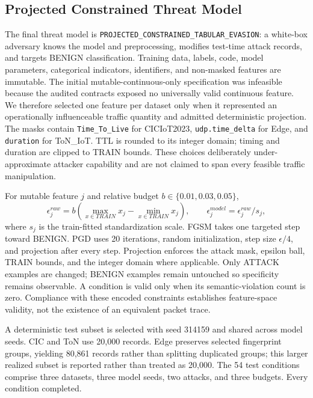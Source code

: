 \documentclass[runningheads]{llncs}
\begin{document}
\subsection{Projected Constrained Threat Model}
The final threat model is \texttt{PROJECTED\_CONSTRAINED\_TABULAR\_EVASION}: a white-box adversary knows the model and preprocessing, modifies test-time attack records, and targets BENIGN classification. Training data, labels, code, model parameters, categorical indicators, identifiers, and non-masked features are immutable. The initial mutable-continuous-only specification was infeasible because the audited contracts exposed no universally valid continuous feature. We therefore selected one feature per dataset only when it represented an operationally influenceable traffic quantity and admitted deterministic projection. The masks contain \texttt{Time\_To\_Live} for CICIoT2023, \texttt{udp.time\_delta} for Edge, and \texttt{duration} for ToN\_IoT. TTL is rounded to its integer domain; timing and duration are clipped to TRAIN bounds. These choices deliberately under-approximate attacker capability and are not claimed to span every feasible traffic manipulation.

For mutable feature $j$ and relative budget $b\in\{0.01,0.03,0.05\}$,
\begin{equation}
\epsilon^{raw}_j=b(\max_{x\in TRAIN}x_j-\min_{x\in TRAIN}x_j),\qquad
\epsilon^{model}_j=\epsilon^{raw}_j/s_j,
\end{equation}
where $s_j$ is the train-fitted standardization scale. FGSM takes one targeted step toward BENIGN. PGD uses 20 iterations, random initialization, step size $\epsilon/4$, and projection after every step. Projection enforces the attack mask, epsilon ball, TRAIN bounds, and the integer domain where applicable. Only ATTACK examples are changed; BENIGN examples remain untouched so specificity remains observable. A condition is valid only when its semantic-violation count is zero. Compliance with these encoded constraints establishes feature-space validity, not the existence of an equivalent packet trace.

A deterministic test subset is selected with seed 314159 and shared across model seeds. CIC and ToN use 20,000 records. Edge preserves selected fingerprint groups, yielding 80,861 records rather than splitting duplicated groups; this larger realized subset is reported rather than treated as 20,000. The 54 test conditions comprise three datasets, three model seeds, two attacks, and three budgets. Every condition completed.
\end{document}
